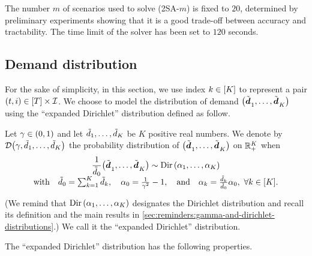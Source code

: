 The number $m$ of scenarios used to solve (2SA-$m$) is fixed to $20$, determined by preliminary experiments showing that it is a good trade-off between accuracy and tractability.
The time limit of the solver has been set to $120$ seconds.


\subsection{Demand distribution}
\label{sec:PDP:numerical-experiments:drawing-realization-of-demand}


For the sake of simplicity, in this section, we use index $k\in\range{K}$ to represent a pair $(t,i)\in\range{\horizon}\times\REF$.
We choose to model the distribution of demand $\bracket{\tilde{\va\demand}_1,\ldots,\tilde{\va\demand}_K}$ using the ``expanded Dirichlet'' distribution defined as follow.


Let $\gamma\in\bracket{0,1}$ and let $\tilde{d}_1,\ldots,\tilde{d}_K$ be $K$ positive real numbers. 
We denote by $\cD\bracket{\gamma,\tilde{\demand}_1,\ldots,\tilde{\demand}_K}$ the probability distribution of $\bracket{\tilde{\va\demand}_1,\ldots,\tilde{\va\demand}_K}$ on $\mathbb{R}_+^K$ when
\begin{equation}
  \begin{array}{c}
  \ds\frac{1}{\tilde{\demand}_0}\bracket{\tilde{\va\demand}_1,\ldots,\tilde{\va\demand}_K}\sim\Dir\bracket{\alpha_1,\ldots,\alpha_K}
  \\ \smallskip
  \mbox{with}
  \quad\tilde{\demand}_0=\sum_{k=1}^K\tilde{\demand}_k,
  \quad\alpha_0=\frac{1}{\gamma^2}-1,
  \quad\mbox{and}
  \quad\alpha_k=\frac{\tilde{\demand}_k}{\tilde{\demand}_0}\alpha_0,\ \forall k\in\range{K}.
  \end{array}
\end{equation}
(We remind that $\Dir\bracket{\alpha_1,\ldots,\alpha_K}$ designates the Dirichlet distribution and recall its definition and the main results in \cref{sec:reminders:gamma-and-dirichlet-distributions}.)
We call it the ``expanded Dirichlet'' distribution.


The ``expanded Dirichlet'' distribution has the following properties.


